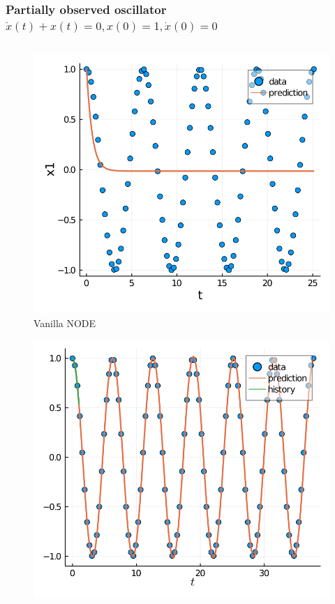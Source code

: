\documentclass[11pt,aspectratio=169]{beamer}
\begin{document}
\begin{frame}[t]
    \frametitle{Partially observed oscillator $\ddot{x}(t) + x(t) = 0, x(0)=1, \dot{x}(0) = 0$}
    \begin{columns}[T]
        \begin{column}{0.25\textwidth}
            \vspace{-0.5cm}
            \begin{figure}
                \centering
                \includegraphics[width=0.94\columnwidth]{figures/vanilla_node.png}
                            \vspace{-0.2cm}
                \caption{Vanilla NODE}
            \end{figure}
            \vspace{-0.7cm}
            \begin{figure}
                \centering
                \includegraphics[width=0.94\columnwidth]{figures/ndde.png}                            \vspace{-0.2cm}

\end{figure}
\end{column}
\end{columns}
\end{frame}
\end{document}
